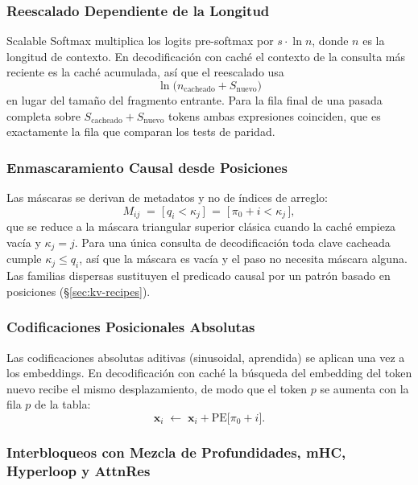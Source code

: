 \subsubsection{Reescalado Dependiente de la Longitud}

Scalable Softmax multiplica los logits pre-softmax por $s\cdot\ln n$, donde $n$ es la longitud de contexto. En decodificación con caché el contexto de la consulta más reciente es la caché acumulada, así que el reescalado usa
\[
\ln\big(n_{\text{cacheado}} + S_{\text{nuevo}}\big)
\]
en lugar del tamaño del fragmento entrante. Para la fila final de una pasada completa sobre $S_{\text{cacheado}}+S_{\text{nuevo}}$ tokens ambas expresiones coinciden, que es exactamente la fila que comparan los tests de paridad.

\subsubsection{Enmascaramiento Causal desde Posiciones}

Las máscaras se derivan de metadatos y no de índices de arreglo:
\[
M_{ij} \;=\; \big[\,q_i < \kappa_j\,\big] \;=\; \big[\,\pi_0 + i < \kappa_j\,\big],
\]
que se reduce a la máscara triangular superior clásica cuando la caché empieza vacía y $\kappa_j = j$. Para una única consulta de decodificación toda clave cacheada cumple $\kappa_j \le q_i$, así que la máscara es vacía y el paso no necesita máscara alguna. Las familias dispersas sustituyen el predicado causal por un patrón basado en posiciones (\S\ref{sec:kv-recipes}).

\subsubsection{Codificaciones Posicionales Absolutas}

Las codificaciones absolutas aditivas (sinusoidal, aprendida) se aplican una vez a los embeddings. En decodificación con caché la búsqueda del embedding del token nuevo recibe el mismo desplazamiento, de modo que el token $p$ se aumenta con la fila $p$ de la tabla:
\[
\mathbf{x}_i \;\leftarrow\; \mathbf{x}_i + \text{PE}\big[\pi_0 + i\big].
\]

\subsubsection{Interbloqueos con Mezcla de Profundidades, mHC, Hyperloop y AttnRes}

